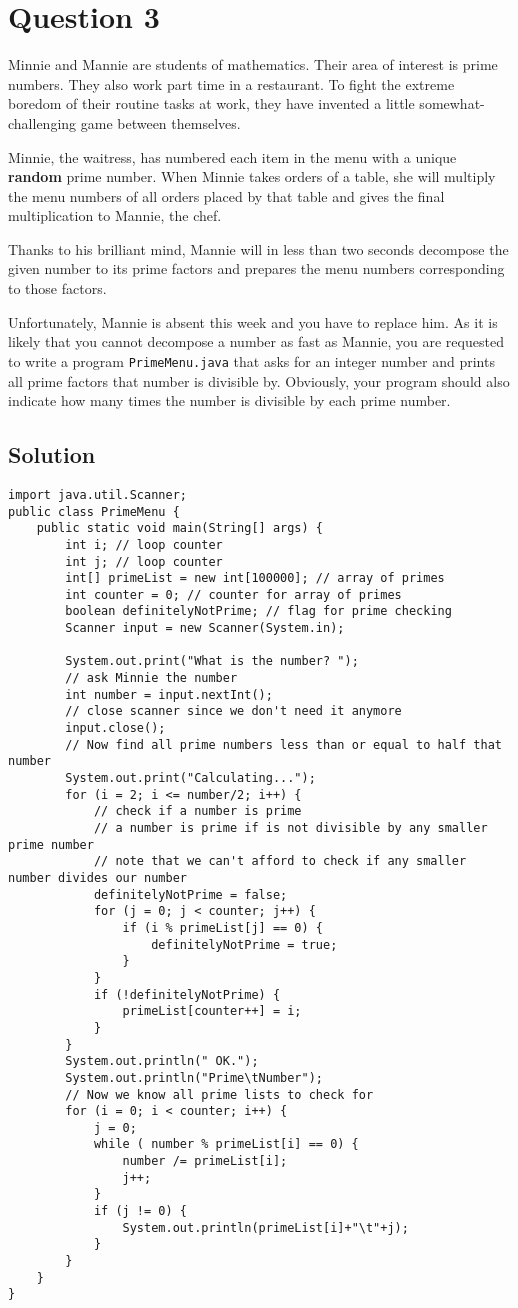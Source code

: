 \documentclass[12pt,letterpaper,twoside]{article}
\begin{document}
\section*{Question 3}

Minnie and Mannie are students of mathematics. Their area of interest is prime numbers. They also work part time in a restaurant. To fight the extreme boredom of their routine tasks at work, they have invented a little somewhat-challenging game between themselves.

Minnie, the waitress, has numbered each item in the menu with a unique \textbf{random} prime number. When Minnie takes orders of a table, she will multiply the menu numbers of all orders placed by that table and gives the final multiplication to Mannie, the chef.

Thanks to his brilliant mind, Mannie will in less than two seconds decompose the given number to its prime factors and prepares the menu numbers corresponding to those factors.

Unfortunately, Mannie is absent this week and you have to replace him. As it is likely that you cannot decompose a number as fast as Mannie, you are requested to write a program \texttt{PrimeMenu.java} that asks for an integer number and prints all prime factors that number is divisible by. Obviously, your program should also indicate how many times the number is divisible by each prime number.

\subsection*{Solution}

\begin{lstlisting}
import java.util.Scanner;
public class PrimeMenu {
	public static void main(String[] args) {
		int i; // loop counter
		int j; // loop counter
		int[] primeList = new int[100000]; // array of primes
		int counter = 0; // counter for array of primes
		boolean definitelyNotPrime; // flag for prime checking
		Scanner input = new Scanner(System.in);

		System.out.print("What is the number? ");
		// ask Minnie the number
		int number = input.nextInt();
		// close scanner since we don't need it anymore
		input.close();
		// Now find all prime numbers less than or equal to half that number
		System.out.print("Calculating...");
		for (i = 2; i <= number/2; i++) {
			// check if a number is prime
			// a number is prime if is not divisible by any smaller prime number
			// note that we can't afford to check if any smaller number divides our number
			definitelyNotPrime = false;
			for (j = 0; j < counter; j++) {
				if (i % primeList[j] == 0) {
					definitelyNotPrime = true;
				}
			}
			if (!definitelyNotPrime) {
				primeList[counter++] = i;
			}
		}
		System.out.println(" OK.");
		System.out.println("Prime\tNumber");
		// Now we know all prime lists to check for
		for (i = 0; i < counter; i++) {
			j = 0;
			while ( number % primeList[i] == 0) {
				number /= primeList[i];
				j++;
			}
			if (j != 0) {
				System.out.println(primeList[i]+"\t"+j);
			}
		}
	}
}
\end{lstlisting}
\end{document}

